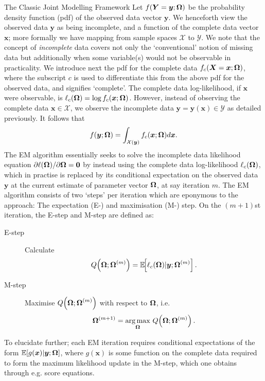 \begin{chapter}{\label{cha:methods-classic}The Classic Joint Modelling Framework}
  Let $f(\bm{Y}=\bm{y};\bm{\mathrm{\Omega}})$ be the probability density function (pdf) of the observed data vector $\bm{y}$. We henceforth view the observed data $\bm{y}$ as being incomplete, and a function of the complete data vector $\bm{x}$; more formally we have mapping from sample spaces $\mathcal{X}$ to $\mathcal{Y}$. We note that the concept of \textit{incomplete} data covers not only the `conventional' notion of missing data but additionally when some variable(s) would not be observable in practicality.\newline
  We introduce next the pdf for the complete data $f_c(\bm{X}=\bm{x};\bm{\mathrm{\Omega}})$, where the subscript $c$ is used to differentiate this from the above pdf for the observed data, and signifies `complete'. The complete data log-likelihood, if $\bm{x}$ were observable, is $\ell_c(\bm{\mathrm{\Omega}})=\log f_c(\bm{x};\bm{\mathrm{\Omega}})$. However, instead of observing the complete data $\bm{x}\in\mathcal{X}$, we observe the incomplete data $\bm{y}=\bm{y}(\bm{x})\in\mathcal{Y}$ as detailed previously. It follows that \citep{Mclachlan08}
  \begin{align*}
      f(\bm{y};\bm{\mathrm{\Omega}})=\int_{\mathcal{X}(\bm{y})}f_c(\bm{x};\bm{\mathrm{\Omega}})d\bm{x}.
  \end{align*}
  The EM algorithm essentially seeks to solve the incomplete data likelihood equation $\partial\ell(\bm{\mathrm{\Omega}})/\partial\bm{\mathrm{\Omega}}=\bm{0}$ by instead using the complete data log-likelihood $\ell_c(\bm{\mathrm{\Omega}})$, which in practise is replaced by its conditional expectation on the observed data $\bm{y}$ at the current estimate of parameter vector $\bm{\mathrm{\Omega}}$, at say iteration $m$. The EM algorithm consists of two `steps' per iteration which are eponymous to the approach: The expectation (E-) and maximisation (M-) step. On the $(m+1)$st iteration, the E-step and M-step are defined as:
  \begin{description}
  \item [E-step] Calculate 
  \begin{equation}
      Q\!\left(\bm{\mathrm{\Omega}};\bm{\mathrm{\Omega}}^{(m)}\right)=\operatorname{\mathbb{E}}\!\!\left[\ell_c(\bm{\mathrm{\Omega}})|\bm{y};\bm{\mathrm{\Omega}}^{(m)}\right].
  \label{eq:em-gen-estep}
  \end{equation}
  
  \item [M-step] Maximise $Q\!\left(\bm{\mathrm{\Omega}};\bm{\mathrm{\Omega}}^{(m)}\right)$ with respect to $\bm{\mathrm{\Omega}}$, i.e.
  \begin{align}
      \bm{\mathrm{\Omega}}^{(m+1)}=\underset{\bm{\mathrm{\Omega}}}{\arg\max}\ Q\!\left(\bm{\mathrm{\Omega}};\bm{\mathrm{\Omega}}^{(m)}\right).
  \label{eq:em-gen-mstep}
  \end{align}
  \end{description}
  To elucidate further; each EM iteration requires conditional expectations of the form $\mathbb{E}\!\left[ g(\bm{x})|\bm{y};\bm{\mathrm{\Omega}}\right]$, where $g(\bm{x})$ is some function on the complete data required to form the maximum likelihood update in the M-step, which one obtains through e.g. score equations.
  

\end{chapter}
